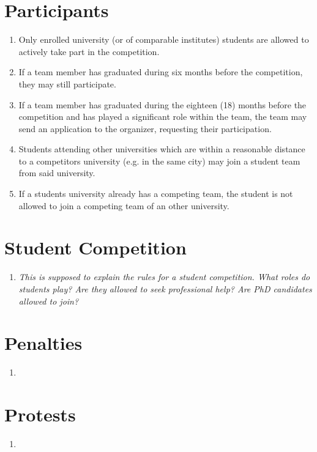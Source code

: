 \begin{enumerate}
    \section{Participants}
    \begin{enumerate}
      \item Only enrolled university (or of comparable institutes) students are allowed to actively take part in the competition.
      \item If a team member has graduated during six months before the competition, they may still participate.
      \item If a team member has graduated during the eighteen (18) months before the competition and has played a significant role within the team,
      the team may send an application to the organizer, requesting their participation. 
      \item Students attending other universities which are within a reasonable distance to a competitors university (e.g. in the same city) may join
      a student team from said university.
      \item If a students university already has a competing team, the student is not allowed to join a competing team of 
      an other university.  
    \end{enumerate}

    \section{Student Competition}
    \begin{enumerate}
      \item \emph{This is supposed to explain the rules for a student competition. What roles do students play? 
      Are they allowed to seek professional help? Are PhD candidates allowed to join?}
    \end{enumerate}



    \section{Penalties}
    \begin{enumerate}
      \item 
    \end{enumerate}

    \section{Protests}
    \begin{enumerate}
      \item 
    \end{enumerate}


\end{enumerate}
